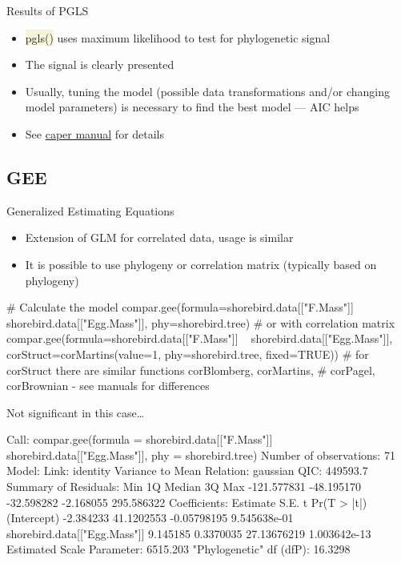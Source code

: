 \documentclass[compress, ucs, xelatex, 11pt, xcolor=svgnames, aspectratio=169,
	hyperref={
		bookmarks=true,
		unicode=true,
		colorlinks=true,
		pdftitle={Molecular data in R},
		plainpages=false,
		pdfauthor={Vojtech Zeisek},
		pdfsubject={Course about phylogeny and evolution in R},
		pdfcreator={XeLaTeX},
		pdfkeywords={R, evolution, phylogeny, molecular data},
		linkcolor=Crimson, %
		anchorcolor=Magenta, %
		citecolor=Magenta, %
		filecolor=Magenta, %
		menucolor=Magenta, %
		urlcolor=DodgerBlue, %
		pdftex},
	url={hyphens, lowtilde} %
	]{beamer}
\renewcommand{\texttt}[1]{\colorbox{Beige}{{\ttfamily #1}}}
\begin{document}
\begin{frame}{Results of PGLS}
	\begin{multicols}{2}
		\texttt{[image: shorebirds.png]}
		\begin{itemize}
			\item \texttt{pgls()} uses maximum likelihood to test for phylogenetic signal
			\item The signal is clearly presented
			\item Usually, tuning the model (possible data transformations and/or changing model parameters) is necessary to find the best model --- AIC helps
			\item See \href{https://CRAN.R-project.org/package=caper}{caper manual} for details
		\end{itemize}
	\end{multicols}
\end{frame}

\subsection{GEE}

\begin{frame}[fragile]{Generalized Estimating Equations}
	\begin{itemize}
		\item Extension of GLM for correlated data, usage is similar
		\item It is possible to use phylogeny or correlation matrix (typically based on phylogeny)
	\end{itemize}
	\vfil
	\begin{spluscode}
    # Calculate the model
    compar.gee(formula=shorebird.data[["F.Mass"]] ~
      shorebird.data[["Egg.Mass"]], phy=shorebird.tree)
    # or with correlation matrix
    compar.gee(formula=shorebird.data[["F.Mass"]] ~
      shorebird.data[["Egg.Mass"]], corStruct=corMartins(value=1,
      phy=shorebird.tree, fixed=TRUE))
    # for corStruct there are similar functions corBlomberg, corMartins,
    # corPagel, corBrownian - see manuals for differences
	\end{spluscode}
\end{frame}

\begin{frame}[fragile]{Not significant in this case\ldots}
	\begin{spluscode}
    Call: compar.gee(formula = shorebird.data[["F.Mass"]] ~
      shorebird.data[["Egg.Mass"]], phy = shorebird.tree)
    Number of observations:  71 
    Model:
                          Link: identity 
     Variance to Mean Relation: gaussian 
    QIC: 449593.7 
    Summary of Residuals:
            Min          1Q      Median          3Q         Max 
    -121.577831  -48.195170  -32.598282   -2.168055  295.586322 
    Coefficients:
                                  Estimate       S.E.           t  Pr(T > |t|)
    (Intercept)                  -2.384233 41.1202553 -0.05798195 9.545638e-01
    shorebird.data[["Egg.Mass"]]  9.145185  0.3370035 27.13676219 1.003642e-13
    Estimated Scale Parameter:  6515.203
    "Phylogenetic" df (dfP):  16.3298 
	\end{spluscode}
\end{frame}
\end{document}
